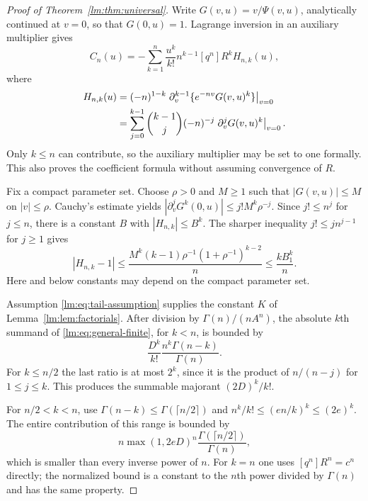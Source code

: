 \begin{proof}[Proof of Theorem~\ref{lm:thm:universal}]
Write $G(v,u)=v/\Psi(v,u)$, analytically continued at $v=0$, so that
$G(0,u)=1$.  Lagrange inversion in an auxiliary multiplier gives
\begin{equation}\label{lm:eq:general-finite}
 C_n(u)=-\sum_{k=1}^n\frac{u^k}{k!}n^{k-1}[q^n]R^k H_{n,k}(u),
\end{equation}
where
\begin{align}
 H_{n,k}(u)&=(-n)^{1-k}
  \left.\partial_v^{k-1}\{e^{-nv}G(v,u)^k\}\right|_{v=0}\notag\\
 &=\sum_{j=0}^{k-1}\binom{k-1}{j}(-n)^{-j}
              \left.\partial_v^jG(v,u)^k\right|_{v=0}.
 \label{lm:eq:H}
\end{align}
Only $k\leq n$ can contribute, so the auxiliary multiplier may be set
to one formally.  This also proves the coefficient formula without
assuming convergence of $R$.

Fix a compact parameter set.  Choose $\rho>0$ and $M\geq1$ such that
$|G(v,u)|\leq M$ on $|v|\leq\rho$.  Cauchy's estimate yields
$|\partial_v^jG^k(0,u)|\leq j!M^k\rho^{-j}$.  Since
$j!\leq n^j$ for $j\leq n$, there is a constant $B$ with
$|H_{n,k}|\leq B^k$.  The sharper inequality
$j!\leq jn^{j-1}$ for $j\geq1$ gives
\begin{equation}\label{lm:eq:H-error}
 |H_{n,k}-1|\leq
 \frac{M^k(k-1)\rho^{-1}(1+\rho^{-1})^{k-2}}n
 \leq \frac{kB_1^k}{n}.
\end{equation}
Here and below constants may depend on the compact parameter set.

Assumption \eqref{lm:eq:tail-assumption} supplies the constant $K$ of
Lemma~\ref{lm:lem:factorials}.  After division by
$\Gamma(n)/(nA^n)$, the absolute $k$th summand of
\eqref{lm:eq:general-finite}, for $k<n$, is bounded by
\begin{equation}\label{lm:eq:k-majorant}
 \frac{D^k}{k!}\frac{n^k\Gamma(n-k)}{\Gamma(n)}.
\end{equation}
For $k\leq n/2$ the last ratio is at most $2^k$, since it is the
product of $n/(n-j)$ for $1\leq j\leq k$.  This produces the
summable majorant $(2D)^k/k!$.

For $n/2<k<n$, use $\Gamma(n-k)\leq\Gamma(\lceil n/2\rceil)$ and
$n^k/k!\leq(en/k)^k\leq(2e)^k$.  The entire contribution of this
range is bounded by
\begin{equation}\label{lm:eq:large-k}
 n\max(1,2eD)^n\frac{\Gamma(\lceil n/2\rceil)}{\Gamma(n)},
\end{equation}
which is smaller than every inverse power of $n$.  For $k=n$ one
uses $[q^n]R^n=c^n$ directly; the normalized bound is a constant to
the $n$th power divided by $\Gamma(n)$ and has the same property.


\end{proof}
